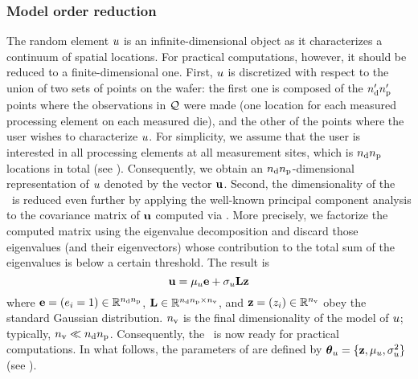 \subsubsection{Model order reduction} 
The random element $u$ is an infinite-dimensional object as it characterizes a continuum of spatial locations.
For practical computations, however, it should be reduced to a finite-dimensional one.
First, $u$ is discretized with respect to the union of two sets of points on the wafer: the first one is composed of the ${n_\text{d}'} {n_\text{p}'}$ points where the observations in $\mathcal{Q}$ were made (one location for each measured processing element on each measured die), and the other of the points where the user wishes to characterize $u$.
For simplicity, we assume that the user is interested in all processing elements at all measurement sites, which is ${n_\text{d}} {n_\text{p}}$ locations in total (see ). Consequently, we obtain an ${n_\text{d}} {n_\text{p}}$-dimensional representation of $u$ denoted by the vector $\mathbf{u}$.
Second, the dimensionality of the \qoi\ is reduced even further by applying the well-known principal component analysis to the covariance matrix of $\mathbf{u}$ computed via .
More precisely, we factorize the computed matrix using the eigenvalue decomposition \cite{press2007} and discard those eigenvalues (and their eigenvectors) whose contribution to the total sum of the eigenvalues is below a certain threshold.
The result is
\begin{equation} \elabel{kl-approximation}
  \vu = \mu_\u \vI + \sigma_\u \mKL \vz
\end{equation}
where $\mathbf{e} = (e_i = 1) \in \mathbb{R}^{{n_\text{d}} {n_\text{p}}}$, $\mathbf{L} \in \mathbb{R}^{{n_\text{d}} {n_\text{p}} \times {n_\text{v}}}$, and $\mathbf{z} = (z_i) \in \mathbb{R}^{n_\text{v}}$ obey the standard Gaussian distribution.
${n_\text{v}}$ is the final dimensionality of the model of $u$; typically, ${n_\text{v}} \ll {n_\text{d}} {n_\text{p}}$.
Consequently, the \qoi\ is now ready for practical computations.
In what follows, the parameters of  are defined by ${\boldsymbol\theta}_u = \{ \mathbf{z}, \mu_u, \sigma^2_u \}$ (see ).

